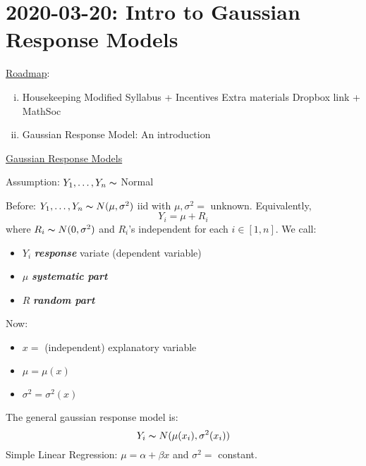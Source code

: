 \section{2020-03-20: Intro to Gaussian Response Models}
\underline{Roadmap}:
\begin{enumerate}[(i)]
    \item Housekeeping
          \subitem Modified Syllabus + Incentives
          \subitem Extra materials
          \subitem Dropbox link + MathSoc
    \item Gaussian Response Model: An introduction
\end{enumerate}
\underline{Gaussian Response Models}

Assumption: $ Y_1,\ldots ,Y_n \thicksim $ Normal

Before: $ Y_1,\ldots ,Y_n \thicksim N(\mu,\sigma^2) $ iid
with $ \mu,\sigma^2= $ unknown. Equivalently,
\[ Y_i=\mu+R_i \]
where $ R_i \thicksim N(0,\sigma^2) $ and $ R_i $'s independent
for each $ i\in[1,n] $. We call:
\begin{itemize}
    \item $ Y_i $ \textbf{\emph{response}} variate (dependent variable)
    \item $ \mu $ \textbf{\emph{systematic part}}
    \item $ R $ \textbf{\emph{random part}}
\end{itemize}

Now:
\begin{itemize}
    \item $ x= $ (independent) explanatory variable
    \item $ \mu=\mu(x) $
    \item $ \sigma^2=\sigma^2(x) $
\end{itemize}
The general gaussian response model is:
\[ Y_i \thicksim N(\mu(x_i),\sigma^2(x_i)) \]
Simple Linear Regression: $ \mu=\alpha+\beta x $
and $ \sigma^2 = $ constant.

